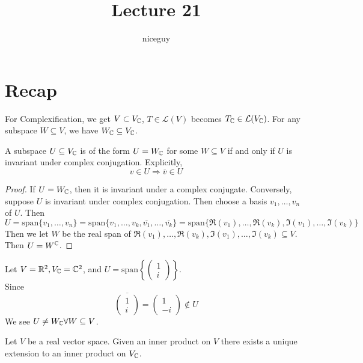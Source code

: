 \documentclass[12pt]{article}
\author{niceguy}
\title{Lecture 21}
\begin{document}
\maketitle

\section{Recap}

For Complexification, we get $V \subset V_{\mathbb{C}}$, $T \in \mathcal L(V)$ becomes $T_{\mathbb{C}} \in \mathcal L(V_{\mathbb{C}})$. For any subspace $W \subseteq V$, we have $W_{\mathbb{C}} \subseteq V_{\mathbb{C}}$.

\begin{prop}
    A subspace $U \subseteq V_{\mathbb{C}}$ is of the form $U = W_{\mathbb{C}}$ for some $W \subseteq V$ if and only if $U$ is invariant under complex conjugation. Explicitly,
    $$v \in U \Rightarrow \overline v \in U$$
\end{prop}

\begin{proof}
    If $U = W_{\mathbb{C}}$, then it is invariant under a complex conjugate. Conversely, suppose $U$ is invariant under complex conjugation. Then choose a basis $v_1,\dots,v_n$ of $U$. Then
    $$U = \text{span}\{v_1,\dots,v_n\} = \text{span}\{v_1,\dots,v_k,\overline{v_1},\dots,\overline{v_k}\} = \text{span}\{\Re(v_1),\dots,\Re(v_k),\Im(v_1),\dots,\Im(v_k)\}$$
    Then we let $W$ be the real span of $\Re(v_1),\dots,\Re(v_k),\Im(v_1),\dots,\Im(v_k) \subseteq V$. Then $U=W^{\mathbb{C}}$.
\end{proof}

\begin{ex}
    Let $V = \mathbb{R}^2, V_{\mathbb{C}} = \mathbb{C}^2$, and $U = \text{span}\left\{\begin{pmatrix} 1 \\ i \end{pmatrix}\right\}$. \\
    Since
    $$\overline{\begin{pmatrix} 1 \\ i \end{pmatrix}} = \begin{pmatrix} 1 \\ -i \end{pmatrix} \notin U$$
    We see $U \neq W_{\mathbb{C}} \forall W \subseteq V$.
\end{ex}

\begin{prop}
    Let $V$ be a real vector space. Given an inner product on $V$ there exists a unique extension to an inner product on $V_{\mathbb{C}}$.
\end{prop}
\end{document}

